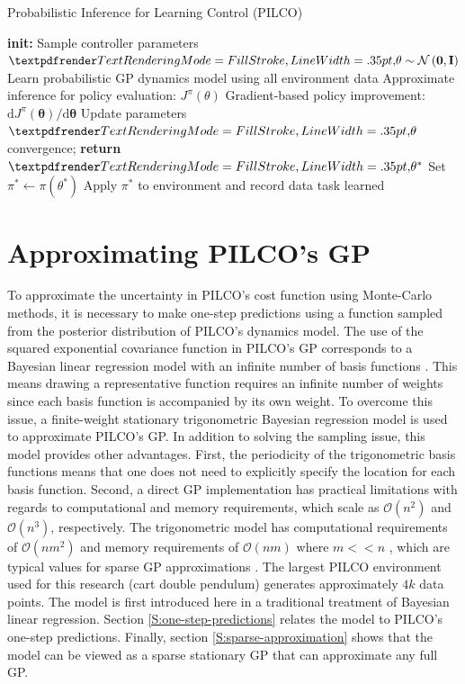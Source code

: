 \begin{algorithm}
\caption{Probabilistic Inference for Learning Control (PILCO)}\label{PILCO:algorithm-1}
\begin{algorithmic}[1]
\State \textbf{init:} Sample controller parameters $\boldgreek{\theta} \sim \mathcal{N}\left(\mathbf{0},\mathbf{I}\right)$
\Repeat{}
\State Learn probabilistic GP dynamics model using all environment data 
\Repeat{}
\State Approximate inference for policy evaluation: $J^{\pi}\left(\theta\right)$ 
\State Gradient-based policy improvement: $\mathrm{d} J^{\pi}(\boldsymbol{\theta}) / \mathrm{d} \boldsymbol{\theta}$ 
\State Update parameters $\boldgreek{\theta}$
\Until convergence; \textbf{return} $\boldgreek{\theta}^{*}$
\State Set $\pi^{*} \gets \pi\left(\theta^{*}\right)$
\State  Apply $\pi^{*}$ to environment and record data
\Until task learned 
\end{algorithmic}
\end{algorithm}

\section{Approximating PILCO's GP}
\label{S:approximating-pilcos-gp}
To approximate the uncertainty in PILCO's cost function using Monte-Carlo methods, it is necessary to make one-step predictions using a function sampled from the posterior distribution of PILCO's dynamics model. The use of the squared exponential covariance function in PILCO's GP corresponds to a Bayesian linear regression model with an infinite number of basis functions \citep{williams2006gaussian}. This means drawing a representative function requires an infinite number of weights since each basis function is accompanied by its own weight. To overcome this issue, a finite-weight stationary trigonometric Bayesian regression model \citep{quia2010sparse} is used to approximate PILCO's GP. In addition to solving the sampling issue, this model provides other advantages. First, the periodicity of the trigonometric basis functions means that one does not need to explicitly specify the location for each basis function. Second, a direct GP implementation has practical limitations with regards to computational and memory requirements, which scale as $\mathcal{O}(n^{2})$ and $\mathcal{O}(n^{3})$, respectively. The trigonometric model has computational requirements of $\mathcal{O}(nm^{2})$ and memory requirements of $\mathcal{O}(nm)$ where $m<<n$ \citep{quia2010sparse}, which are typical values for sparse GP approximations \citep{quinonero2005unifying}. The largest PILCO environment used for this research (cart double pendulum) generates approximately $4k$ data points. The model is first introduced here in a traditional treatment of Bayesian linear regression. Section \ref{S:one-step-predictions} relates the model to PILCO's one-step predictions. Finally, section \ref{S:sparse-approximation} shows that the model can be viewed as a sparse stationary GP that can approximate any full GP.


